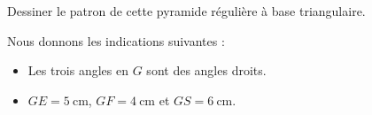 
\begin{exercice}\label{exo2smath-0184}

    Dessiner le patron de cette pyramide régulière à base triangulaire.
    \begin{center}                                       
                                               
\end{center}
    
Nous donnons les indications suivantes :
\begin{itemize}
    \item 
        Les trois angles en \( G\) sont des angles droits.
    \item
        \( GE=\SI{5}{\centi\meter}\), \( GF=\SI{4}{\centi\meter}\) et \( GS=\SI{6}{\centi\meter}\).
\end{itemize}

\end{exercice}
